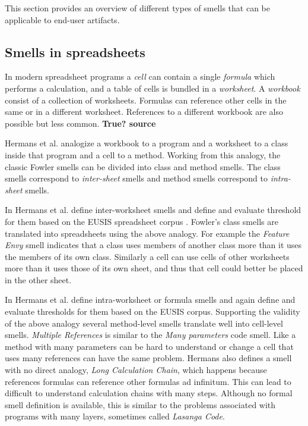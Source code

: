 \documentclass[10pt,conference,compsocconf]{IEEEtran}
\newcommand{\todo}[1]{\textbf{#1}}
\begin{document}
This section provides an overview of different types of smells that can be applicable to end-user artifacts.

\subsection{Smells in spreadsheets}

In modern spreadsheet programs a \textit{cell} can contain a single \textit{formula} which performs a calculation, and a table of cells is bundled in a \textit{worksheet}.
A \textit{workbook} consist of a collection of worksheets.
Formulas can reference other cells in the same or in a different worksheet.
References to a different workbook are also possible but less common. \todo{True? source}
 
Hermans et al. \cite{Hermans2012inter} \cite{Hermans2012intra} analogize a workbook to a program and a worksheet to a class inside that program and a cell to a method.
Working from this analogy, the classic Fowler smells can be divided into class and method smells.
The class smells correspond to \textit{inter-sheet} smells and method smells correspond to \textit{intra-sheet} smells.

In \cite{Hermans2012inter} Hermans et al. define inter-worksheet smells and define and evaluate threshold for them based on the EUSIS spreadsheet corpus \cite{fisher2005euses}.
Fowler's class smells are translated into spreadsheets using the above analogy. 
For example the \textit{Feature Envy} smell indicates that a class uses members of another class more than it uses the members of its own class.
Similarly a cell can use cells of other worksheets more than it uses those of its own sheet, and thus that cell could better be placed in the other sheet.

In \cite{Hermans2012intra} Hermans et al. define intra-worksheet or formula smells and again define and evaluate thresholds for them based on the EUSIS corpus.
Supporting the validity of the above analogy several method-level smells translate well into cell-level smells.
\textit{Multiple References} is similar to the \textit{Many parameters} code smell. Like a method with many parameters can be hard to understand or change a cell that uses many references can have the same problem.
Hermans also defines a smell with no direct analogy, \textit{Long Calculation Chain}, which happens because references formulas can reference other formulas ad infinitum.
This can lead to difficult to understand calculation chains with many steps.
Although no formal smell definition is available, this is similar to the problems associated with programs with many layers, sometimes called \textit{Lasanga Code}.
\end{document}
